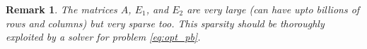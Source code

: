 \documentclass{article} %
\newtheorem{remark}{Remark}
\begin{document}


\begin{remark}
  The matrices $A$, $E_1$, and $E_2$ are very large (can have upto billions of rows and columns) but very sparse too.
This sparsity should be thoroughly exploited by a solver for problem \eqref{eq:opt_pb}.
\end{remark}
\end{document}
